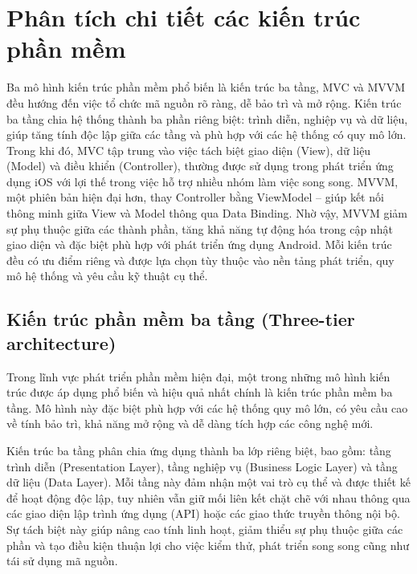 \section{Phân tích chi tiết các kiến trúc phần mềm}

\begin{flushleft}
  \hspace*{0.8cm}Ba mô hình kiến trúc phần mềm phổ biến là kiến trúc ba tầng, MVC và MVVM đều hướng đến việc tổ chức mã nguồn rõ ràng, dễ bảo trì và mở rộng. Kiến trúc ba tầng chia hệ thống thành ba phần riêng biệt: trình diễn, nghiệp vụ và dữ liệu, giúp tăng tính độc lập giữa các tầng và phù hợp với các hệ thống có quy mô lớn. Trong khi đó, MVC tập trung vào việc tách biệt giao diện (View), dữ liệu (Model) và điều khiển (Controller), thường được sử dụng trong phát triển ứng dụng iOS với lợi thế trong việc hỗ trợ nhiều nhóm làm việc song song. MVVM, một phiên bản hiện đại hơn, thay Controller bằng ViewModel – giúp kết nối thông minh giữa View và Model thông qua Data Binding. Nhờ vậy, MVVM giảm sự phụ thuộc giữa các thành phần, tăng khả năng tự động hóa trong cập nhật giao diện và đặc biệt phù hợp với phát triển ứng dụng Android. Mỗi kiến trúc đều có ưu điểm riêng và được lựa chọn tùy thuộc vào nền tảng phát triển, quy mô hệ thống và yêu cầu kỹ thuật cụ thể.
  \end{flushleft}
  
  

\subsection{Kiến trúc phần mềm ba tầng (Three-tier architecture)}
\renewcommand{\labelitemi}{--}    
\begin{flushleft}
  \hspace*{0.8cm}Trong lĩnh vực phát triển phần mềm hiện đại, một trong những mô hình kiến trúc được áp dụng phổ biến và hiệu quả nhất chính là kiến trúc phần mềm ba tầng. Mô hình này đặc biệt phù hợp với các hệ thống quy mô lớn, có yêu cầu cao về tính bảo trì, khả năng mở rộng và dễ dàng tích hợp các công nghệ mới.
  \end{flushleft}
  
  \begin{flushleft}
  \hspace*{0.8cm}Kiến trúc ba tầng phân chia ứng dụng thành ba lớp riêng biệt, bao gồm: tầng trình diễn (Presentation Layer), tầng nghiệp vụ (Business Logic Layer) và tầng dữ liệu (Data Layer). Mỗi tầng này đảm nhận một vai trò cụ thể và được thiết kế để hoạt động độc lập, tuy nhiên vẫn giữ mối liên kết chặt chẽ với nhau thông qua các giao diện lập trình ứng dụng (API) hoặc các giao thức truyền thông nội bộ. Sự tách biệt này giúp nâng cao tính linh hoạt, giảm thiểu sự phụ thuộc giữa các phần và tạo điều kiện thuận lợi cho việc kiểm thử, phát triển song song cũng như tái sử dụng mã nguồn.
  \end{flushleft}

